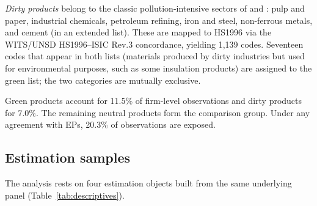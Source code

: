 \documentclass[12pt]{article}
\begin{document}
\emph{Dirty products} belong to the classic pollution-intensive sectors of
\citet{mani1998} and \citet{low1992}: pulp and paper, industrial chemicals, petroleum
refining, iron and steel, non-ferrous metals, and cement (in an extended list). These are
mapped to HS1996 via the WITS/UNSD HS1996--ISIC Rev.3 concordance, yielding 1{,}139
codes. Seventeen codes that appear in both lists (materials produced by dirty industries
but used for environmental purposes, such as some insulation products) are assigned to
the green list; the two categories are mutually exclusive.

Green products account for 11.5\% of firm-level observations and dirty products for
7.0\%. The remaining neutral products form the comparison group. Under any agreement with
EPs, 20.3\% of observations are exposed.

\subsection{Estimation samples}

The analysis rests on four estimation objects built from the same underlying panel
(Table~\ref{tab:descriptives}).
\end{document}
